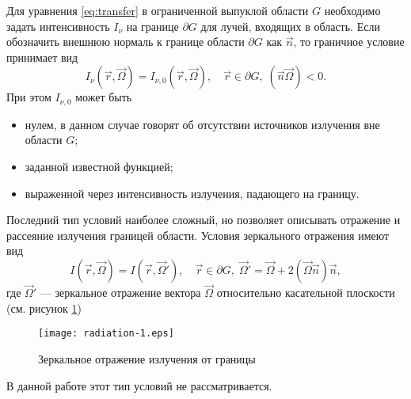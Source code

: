 Для уравнения \eqref{eq:transfer} в ограниченной выпуклой области $G$ необходимо задать интенсивность $I_\nu$ на границе $\partial G$ для лучей, входящих в область. Если обозначить внешнюю нормаль к границе области $\partial G$ как $\vec n$, то граничное условие принимает вид
\[
I_\nu(\vec r, \vec \Omega) = I_{\nu,0}(\vec r, \vec \Omega), \quad \vec r \in \partial G,\; (\vec n \vec \Omega) < 0.
\]
При этом $I_{\nu,0}$ может быть
\begin{itemize}
\item нулем, в данном случае говорят об отсутствии источников излучения вне области $G$;
\item заданной известной функцией;
\item выраженной через интенсивность излучения, падающего на границу.
\end{itemize}
Последний тип условий наиболее сложный, но позволяет описывать отражение и рассеяние излучения границей области. Условия зеркального отражения имеют вид
\[
I(\vec r, \vec \Omega) = I(\vec r, \vec \Omega'), \quad \vec r \in \partial G, \; \vec \Omega' = \vec \Omega + 2 (\vec \Omega \vec n) \vec n,
\]
где $\vec \Omega'$ --- зеркальное отражение вектора $\vec \Omega$ относительно касательной плоскости (см. рисунок \ref{fig:reflect})
\begin{figure}[ht!]
\centering
\texttt{[image: radiation-1.eps]}
\caption{Зеркальное отражение излучения от границы}
\label{fig:reflect}
\end{figure}

В данной работе этот тип условий не рассматривается.

